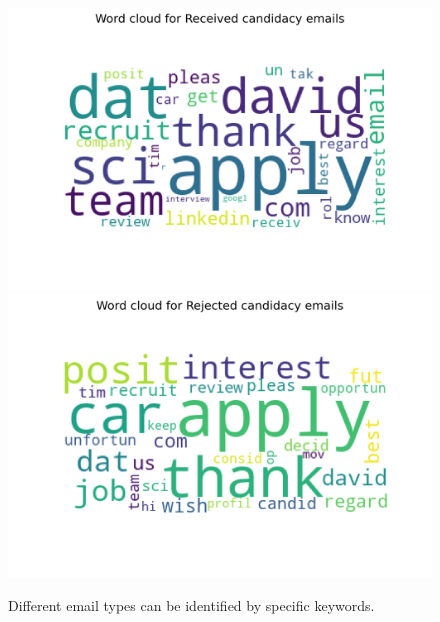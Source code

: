 \documentclass[12pt]{article}
\begin{document}
\begin{figure}
    \center
	\includegraphics[width = \linewidth]{wordcloud_Received.png}
	\includegraphics[width = \linewidth]{wordcloud_Rejected.png}
	\caption{Different email types can be identified by specific keywords.  \label{fig:email_keywords}}
\end{figure}
\end{document}
